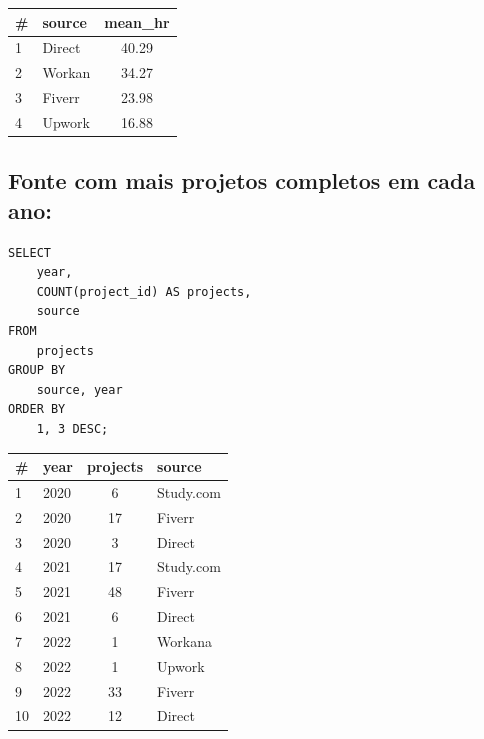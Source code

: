 \documentclass{queriessql}
\begin{document}
\begin{tabular}{llc}
    \# & \textbf{source} & \textbf{mean\_hr} \\ \hline
    1 & Direct & 40.29 \\
    2 & Workan & 34.27 \\
    3 & Fiverr & 23.98 \\
    4 & Upwork & 16.88
\end{tabular}

\clearpage %

\subsection{Fonte com mais projetos completos em cada ano:}
\begin{lstlisting}
SELECT
    year,
    COUNT(project_id) AS projects,
    source
FROM 
    projects
GROUP BY 
    source, year
ORDER BY
    1, 3 DESC;
\end{lstlisting}

\begin{tabular}{llcl}
    \# & \textbf{year} & \textbf{projects} & \textbf{source} \\ \hline
    1 & 2020 & 6 & Study.com \\
    2 & 2020 & 17 & Fiverr \\
    3 & 2020 & 3 & Direct \\
    4 & 2021 & 17 & Study.com \\
    5 & 2021 & 48 & Fiverr \\
    6 & 2021 & 6 & Direct \\
    7 & 2022 & 1 & Workana \\
    8 & 2022 & 1 & Upwork \\
    9 & 2022 & 33 & Fiverr \\
    10 & 2022 & 12 & Direct
\end{tabular}
\end{document}
